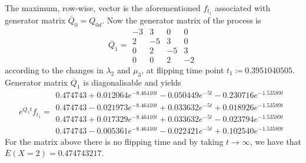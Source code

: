 \documentclass{article}
\newcommand{\statessymbol}{\mathcal{X}}
\newcommand{\stateset}{\statessymbol}
\begin{document}
The maximum, row-wise, vector is the aforementioned $f_{t_1}$ associated with generator matrix $\overline{Q}_{0}=Q_{0d}$.
Now the generator matrix of the process is
\begin{equation*} 
 \overline{Q}_{1}= 
 \begin{array}{|rrrr|}
  -3 & 3 & 0 & 0 \\
  2 & -5 & 3 & 0 \\
  0 & 2 & -5 & 3 \\
  0 & 0 & 2 & -2 
 \end{array}
 \end{equation*}
according to the changes in $\lambda_{2}$ and $\mu_{3}$, at flipping time point $t_{1}\coloneqq 0.3951040505$.
Generator matrix $\overline{Q}_1$ is diagonalisable and yields 
\begin{equation*} 
 e^{\overline{Q}_{1}t}f_{t_1}= 
 \begin{array}{|r|}
 0.474743+0.012064e^{-8.46410t}-0.050449e^{-5t}-0.230716e^{-1.53589t}\\
 0.474743-0.021973e^{-8.46410t}+0.033632e^{-5t}+0.018926e^{-1.53589t}\\
 0.474743+0.017329e^{-8.46410t}+0.033632e^{-5t}-0.023794e^{-1.53589t}\\
 0.474743-0.005361e^{-8.46410t}-0.022421e^{-5t}+0.102540e^{-1.53589t}  
 \end{array}
 \end{equation*}
For the matrix above there is no flipping time and by taking $t\to\infty$, we have that
$\overline{E}(X=2) = 0.474743217$.\\\\\\













\end{document}
